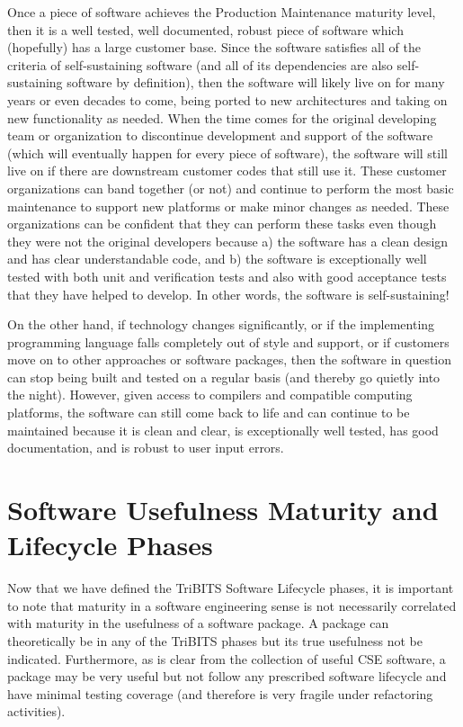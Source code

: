 \documentclass[11pt]{SANDreport}
\begin{document}
Once a piece of software achieves the Production Maintenance maturity
level, then it is a well tested, well documented, robust piece of
software which (hopefully) has a large customer base.  Since the
software satisfies all of the criteria of self-sustaining software
(and all of its dependencies are also self-sustaining software by
definition), then the software will likely live on for many years or
even decades to come, being ported to new architectures and taking on
new functionality as needed.  When the time comes for the original
developing team or organization to discontinue development and support
of the software (which will eventually happen for every piece of
software), the software will still live on if there are downstream
customer codes that still use it.  These customer organizations can
band together (or not) and continue to perform the most basic
maintenance to support new platforms or make minor changes as needed.
These organizations can be confident that they can perform these tasks
even though they were not the original developers because a) the
software has a clean design and has clear understandable code, and b)
the software is exceptionally well tested with both unit and
verification tests and also with good acceptance tests that they have
helped to develop.  In other words, the software is self-sustaining!

On the other hand, if technology changes significantly, or if the
implementing programming language falls completely out of style and
support, or if customers move on to other approaches or software
packages, then the software in question can stop being built and
tested on a regular basis (and thereby go quietly into the night).
However, given access to compilers and compatible computing
platforms, the software can still come back to life and can continue
to be maintained because it is clean and clear, is exceptionally well
tested, has good documentation, and is robust to user input errors.


%
{}\section{Software Usefulness Maturity and Lifecycle Phases}
\label{sec:usefulness_maturity_lifecycle_phases}
%

Now that we have defined the TriBITS Software Lifecycle phases, it is
important to note that maturity in a software engineering sense is not
necessarily correlated with maturity in the usefulness of a software
package.  A package can theoretically be in any of the TriBITS phases
but its true usefulness not be indicated.  Furthermore, as is clear
from the collection of useful CSE software, a package may be very
useful but not follow any prescribed software lifecycle and have
minimal testing coverage (and therefore is very fragile under
refactoring activities).
\end{document}
